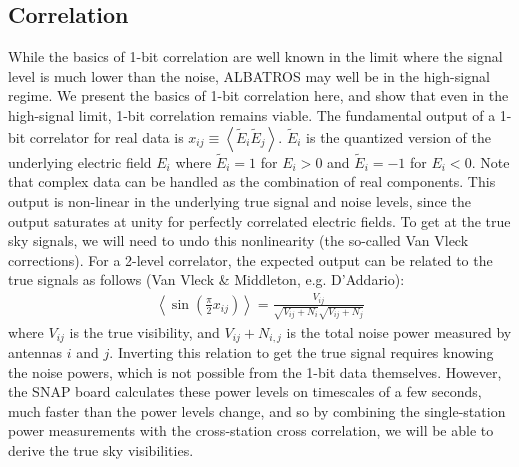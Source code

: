 \documentclass{ws-jai}
\begin{document}
\subsection{Correlation}
While the basics of 1-bit correlation are well known in the limit where the signal level is much lower than the noise, ALBATROS may well be in the high-signal regime.  We present the basics of 1-bit correlation here, and show that even in the high-signal limit, 1-bit correlation remains viable.
The fundamental output of a 1-bit correlator for real data is $x_{ij} \equiv \left < \tilde{E}_i \tilde{E}_j \right >$.  $ \tilde{E}_i$ is the quantized version of the underlying electric field $E_i$ where $ \tilde{E}_i=1$ for $E_i>0$ and $ \tilde{E}_i=-1$ for $E_i<0$.  Note that complex data can be handled as the combination of real components.  This output is non-linear in the underlying true signal and noise levels, since the output saturates at unity for perfectly correlated electric fields.  To get at the true sky signals, we will need to undo this nonlinearity (the so-called Van Vleck corrections).  For a 2-level correlator, the expected output can be related to the true signals as follows (Van Vleck \& Middleton, e.g. D'Addario):
\begin{eqnarray}
\label{eqn:1bit_output}
\left < \sin(\frac{\pi}{2}x_{ij})\right > = \frac{V_{ij}}{\sqrt{V_{ij}+N_i}\sqrt{V_{ij}+N_j}}
\end{eqnarray}
where $V_{ij}$ is the true visibility, and $V_{ij}+N_{i,j}$ is the total noise power measured by antennas $i$ and $j$.  Inverting this relation to get the true signal requires knowing the noise powers, which is not possible from the 1-bit data themselves.  However, the SNAP board calculates these power levels on timescales of a few seconds, much faster than the power levels change, and so by combining the single-station power measurements with the cross-station cross correlation, we will be able to derive the true sky visibilities.  
\end{document}
